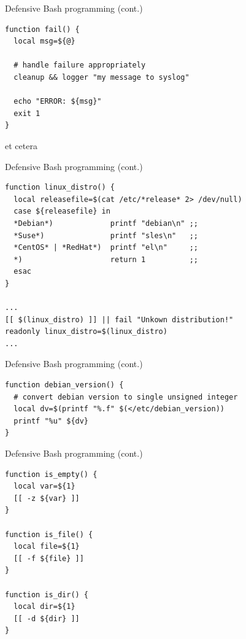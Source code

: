 \begin{frame}[fragile]{Defensive Bash programming (cont.)}

\begin{verbatim}
function fail() {
  local msg=${@}

  # handle failure appropriately
  cleanup && logger "my message to syslog"

  echo "ERROR: ${msg}"
  exit 1
}
\end{verbatim}

et cetera

\end{frame}

\begin{frame}[fragile]{Defensive Bash programming (cont.)}

\begin{verbatim}
function linux_distro() {
  local releasefile=$(cat /etc/*release* 2> /dev/null)
  case ${releasefile} in
  *Debian*)             printf "debian\n" ;;
  *Suse*)               printf "sles\n"   ;;
  *CentOS* | *RedHat*)  printf "el\n"     ;;
  *)                    return 1          ;;
  esac
}

...
[[ $(linux_distro) ]] || fail "Unkown distribution!"
readonly linux_distro=$(linux_distro)
...
\end{verbatim}

\end{frame}

\begin{frame}[fragile]{Defensive Bash programming (cont.)}

\begin{verbatim}
function debian_version() {
  # convert debian version to single unsigned integer
  local dv=$(printf "%.f" $(</etc/debian_version))
  printf "%u" ${dv}
}
\end{verbatim}

\end{frame}

\begin{frame}[fragile]{Defensive Bash programming (cont.)}

\begin{verbatim}
function is_empty() {
  local var=${1}
  [[ -z ${var} ]]
}

function is_file() {
  local file=${1}
  [[ -f ${file} ]]
}

function is_dir() {
  local dir=${1}
  [[ -d ${dir} ]]
}
\end{verbatim}

\end{frame}

